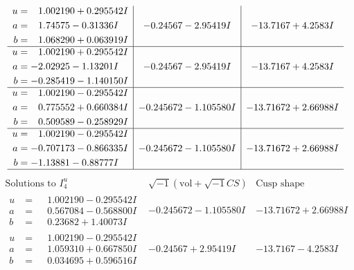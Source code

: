 \documentclass[1p]{elsarticle_modified}
\theoremstyle{definition}
\newcommand{\I}{\sqrt{-1}}
\begin{document}
$$\begin{array}{c|c|c}
\begin{aligned}
u &= \phantom{-}1.002190 + 0.295542 I \\
a &= \phantom{-}1.74575 - 0.31336 I \\
b &= \phantom{-}1.068290 + 0.063919 I\end{aligned}
 & -0.24567 - 2.95419 I & -13.7167 + 4.2583 I \\ \hline\begin{aligned}
u &= \phantom{-}1.002190 + 0.295542 I \\
a &= -2.02925 - 1.13201 I \\
b &= -0.285419 - 1.140150 I\end{aligned}
 & -0.24567 - 2.95419 I & -13.7167 + 4.2583 I \\ \hline\begin{aligned}
u &= \phantom{-}1.002190 - 0.295542 I \\
a &= \phantom{-}0.775552 + 0.660384 I \\
b &= \phantom{-}0.509589 - 0.258929 I\end{aligned}
 & -0.245672 - 1.105580 I & -13.71672 + 2.66988 I \\ \hline\begin{aligned}
u &= \phantom{-}1.002190 - 0.295542 I \\
a &= -0.707173 - 0.866335 I \\
b &= -1.13881 - 0.88777 I\end{aligned}
 & -0.245672 - 1.105580 I & -13.71672 + 2.66988 I\\
 \hline 
 \end{array}$$\newpage$$\begin{array}{c|c|c}  
\text{Solutions to }I^u_{4}& \I (\text{vol} + \sqrt{-1}CS) & \text{Cusp shape}\\
 \hline 
\begin{aligned}
u &= \phantom{-}1.002190 - 0.295542 I \\
a &= \phantom{-}0.567084 - 0.568800 I \\
b &= \phantom{-}0.23682 + 1.40073 I\end{aligned}
 & -0.245672 - 1.105580 I & -13.71672 + 2.66988 I \\ \hline\begin{aligned}
u &= \phantom{-}1.002190 - 0.295542 I \\
a &= \phantom{-}1.059310 + 0.667850 I \\
b &= \phantom{-}0.034695 + 0.596516 I\end{aligned}
 & -0.24567 + 2.95419 I & -13.7167 - 4.2583 I \\ \hline\begin{aligned}

\end{aligned}
\end{array}$$
\end{document}
